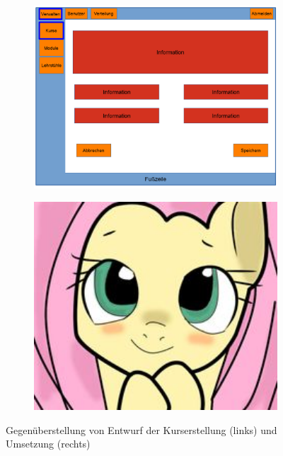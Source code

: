         \begin{figure}
            \centering
            \begin{subfigure}{0.49\textwidth}
                \includegraphics[width=1.0\textwidth]{./implementation/images/MockUpsBackend/backendEdit.png}
            \end{subfigure}
            \begin{subfigure}{0.49\textwidth}
                \includegraphics[width=1.0\textwidth]{./implementation/images/dummy.jpg}
            \end{subfigure}
            \caption{Gegenüberstellung von Entwurf der Kurserstellung (links) und Umsetzung (rechts)}
            \label{fig:comparisonEdit}
        \end{figure}
    
